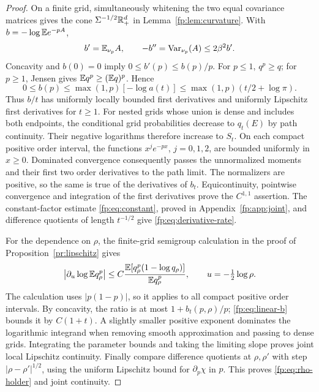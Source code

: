 \begin{proof}
On a finite grid, simultaneously whitening the two equal covariance matrices gives the cone $\Sigma^{-1/2}\mathbb R_+^d$ in Lemma~\ref{fp:lem:curvature}. With $b=-\log\mathbb E e^{-pA}$,
\[
 b'=\mathbb E_{\nu_p}A,\qquad
 -b''=\operatorname{Var}_{\nu_p}(A)\le2\beta^2b'.
\]
Concavity and $b(0)=0$ imply $0\le b'(p)\le b(p)/p$. For $p\le1$, $q^p\ge q$; for $p\ge1$, Jensen gives $\mathbb E q^p\ge(\mathbb E q)^p$. Hence
\begin{equation}\label{fp:eq:linear-b}
 0\le b(p)\le\max(1,p)[-\log a(t)]
 \le\max(1,p)(t/2+\log\pi).
\end{equation}
Thus $b/t$ has uniformly locally bounded first derivatives and uniformly Lipschitz first derivatives for $t\ge1$. For nested grids whose union is dense and includes both endpoints, the conditional grid probabilities decrease to $q_t(E)$ by path continuity. Their negative logarithms therefore increase to $S_t$. On each compact positive order interval, the functions $x^j e^{-px}$, $j=0,1,2$, are bounded uniformly in $x\ge0$. Dominated convergence consequently passes the unnormalized moments and their first two order derivatives to the path limit. The normalizers are positive, so the same is true of the derivatives of $b_t$. Equicontinuity, pointwise convergence and integration of the first derivatives prove the $C^{1,1}$ assertion. The constant-factor estimate \eqref{fp:eq:constant}, proved in Appendix~\ref{fp:app:joint}, and difference quotients of length $t^{-1/2}$ give \eqref{fp:eq:derivative-rate}.

For the dependence on $\rho$, the finite-grid semigroup calculation
in the proof of Proposition~\ref{pr:lipschitz} gives
\[
 \left|\partial_u\log\mathbb E q_\rho^p\right|
 \le C\frac{\mathbb E[q_\rho^p(1-\log q_\rho)]}{\mathbb E q_\rho^p},
 \qquad u=-\tfrac12\log\rho.
\]
The calculation uses $|p(1-p)|$, so it applies to all compact positive
order intervals. By concavity, the ratio is at most $1+b_t(p,\rho)/p$;
\eqref{fp:eq:linear-b} bounds it by $C(1+t)$. A slightly smaller
positive exponent dominates the logarithmic integrand when removing
smooth approximation and passing to dense grids. Integrating the
parameter bounds and taking the limiting slope proves joint local
Lipschitz continuity. Finally compare difference quotients at $\rho,\rho'$ with step $|\rho-\rho'|^{1/2}$, using the uniform Lipschitz bound for $\partial_p\chi$ in $p$. This proves \eqref{fp:eq:rho-holder} and joint continuity.
\end{proof}

